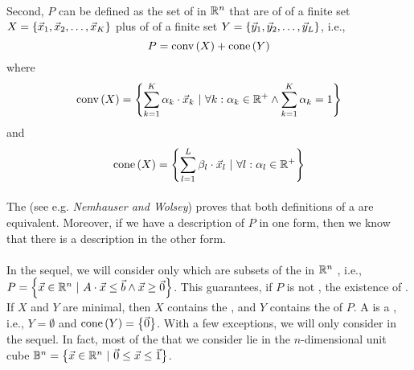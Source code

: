 \paragraph{}
Second, $P$ can be defined as the set of  in $\RRR^n$ that are  of  of a finite set $X=\accl{\vec{x}_1,\vec{x}_2,\ldots,\vec{x}_K}$ plus  of  of a finite set $Y=\accl{\vec{y}_1,\vec{y}_2,\ldots,\vec{y}_L}$, i.e.,
\begin{equation}
P=\funm{conv}{X}+\funm{cone}{Y}
\end{equation}
where
\begin{equation}
\funm{conv}{X}=\condset{\sumieqb[k]{1}{K}{\alpha_k\cdot\vec{x}_k}}{\forall k:\alpha_k\in\RRR^+\wedge\sumieqb[k]{1}{K}{\alpha_k}=1}
\end{equation}
and
\begin{equation}
\funm{cone}{X}=\condset{\sumieqb[l]{1}{L}{\beta_l\cdot\vec{x}_l}}{\forall l:\alpha_l\in\RRR^+}
\end{equation}

\paragraph{}
The  (see e.g. \emph{Nemhauser and Wolsey}\cite{citeulike:2212037}) proves that both definitions of a  are equivalent. Moreover, if we have a description of $P$ in one form, then we know that there is a description in the other form.

\paragraph{}
In the sequel, we will consider only  which are subsets of the  in $\RRR^n$ , i.e., $P=\condset{\vec{x}\in\RRR^n}{A\cdot\vec{x}\leq\vec{b}\wedge\vec{x}\geq\vec{0}}$. This guarantees, if $P$ is not , the existence of . If $X$ and $Y$ are minimal, then $X$ contains the , and $Y$ contains the  of $P$. A  is a , i.e., $Y=\emptyset$ and $\funm{cone}{Y}=\accl{\vec{0}}$. With a few exceptions, we will only consider  in the sequel. In fact, most of the  that we consider lie in the $n$-dimensional unit cube $\BBB^n=\condset{\vec{x}\in\RRR^n}{\vec{0}\leq\vec{x}\leq\vec{1}}$.

